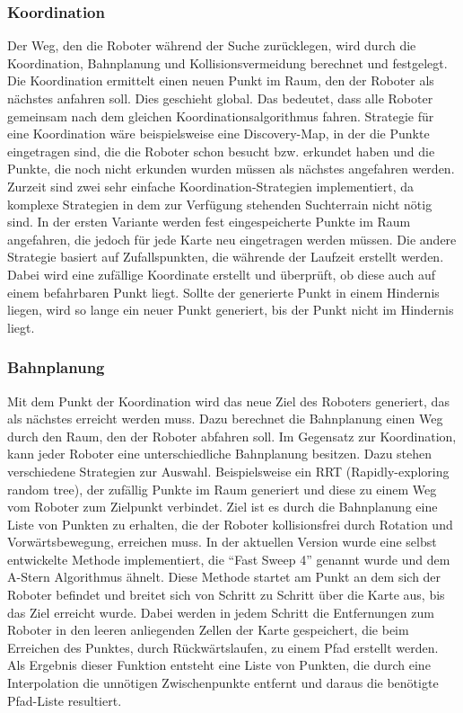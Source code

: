 \subsubsection{Koordination}
Der Weg, den die Roboter während der Suche zurücklegen, wird durch die Koordination, Bahnplanung und Kollisionsvermeidung berechnet und festgelegt. Die Koordination ermittelt einen neuen Punkt im Raum, den der Roboter als nächstes anfahren soll. Dies geschieht global. Das bedeutet, dass alle Roboter gemeinsam nach dem gleichen Koordinationsalgorithmus fahren. Strategie für eine Koordination wäre beispielsweise eine Discovery-Map, in der die Punkte eingetragen sind, die die Roboter schon besucht bzw. erkundet haben und die Punkte, die noch nicht erkunden wurden müssen als nächstes angefahren werden. Zurzeit sind zwei sehr einfache Koordination-Strategien implementiert, da komplexe Strategien in dem zur Verfügung stehenden Suchterrain nicht nötig sind. In der ersten Variante werden fest eingespeicherte Punkte im Raum angefahren, die jedoch für jede Karte neu eingetragen werden müssen. Die andere Strategie basiert auf Zufallspunkten, die währende der Laufzeit erstellt werden. Dabei wird eine zufällige Koordinate erstellt und überprüft, ob diese auch auf einem befahrbaren Punkt liegt. Sollte der generierte Punkt in einem Hindernis liegen, wird so lange ein neuer Punkt generiert, bis der Punkt nicht im Hindernis liegt.\\
\subsubsection{Bahnplanung}
Mit dem Punkt der Koordination wird das neue Ziel des Roboters
generiert, das als nächstes erreicht werden muss. Dazu berechnet die
Bahnplanung einen Weg durch den Raum, den der Roboter abfahren soll. Im
Gegensatz zur Koordination, kann jeder Roboter eine unterschiedliche
Bahnplanung besitzen. Dazu stehen verschiedene Strategien zur Auswahl.
Beispielsweise ein RRT (Rapidly-exploring random tree), der zufällig
Punkte im Raum generiert und diese zu einem Weg vom Roboter zum
Zielpunkt verbindet. Ziel ist es durch die Bahnplanung eine Liste von
Punkten zu erhalten, die der Roboter kollisionsfrei durch Rotation und
Vorwärtsbewegung, erreichen muss. In der aktuellen Version wurde eine
selbst entwickelte Methode implementiert, die "`Fast Sweep 4"' genannt
wurde und dem A-Stern Algorithmus 
ähnelt. Diese Methode startet am Punkt an dem sich der Roboter befindet und breitet sich von Schritt zu Schritt über die Karte aus, bis das Ziel erreicht wurde. Dabei werden in jedem Schritt die Entfernungen zum Roboter in den leeren anliegenden Zellen der Karte gespeichert, die beim Erreichen des Punktes, durch Rückwärtslaufen, zu einem Pfad erstellt werden. Als Ergebnis dieser Funktion entsteht eine Liste von Punkten, die durch eine Interpolation die unnötigen Zwischenpunkte entfernt und daraus die benötigte Pfad-Liste resultiert.\\
